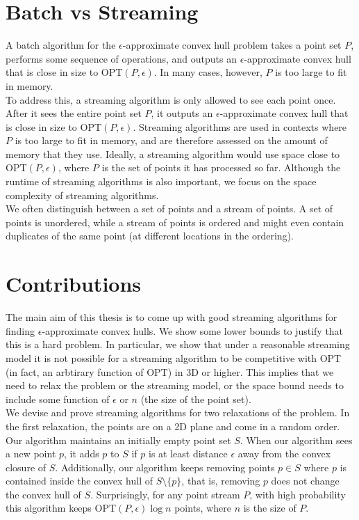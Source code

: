 \section{Batch vs Streaming}

A batch algorithm for the $\epsilon$-approximate convex hull problem takes a point set $P$, performs some sequence of operations, and outputs an $\epsilon$-approximate convex hull that is close in size to OPT$(P, \epsilon)$. In many cases, however, $P$ is too large to fit in memory.
\\

To address this, a streaming algorithm is only allowed to see each point once. After it sees the entire point set $P$, it outputs an $\epsilon$-approximate convex hull that is close in size to OPT$(P, \epsilon)$. Streaming algorithms are used in contexts where $P$ is too large to fit in memory, and are therefore assessed on the amount of memory that they use. Ideally, a streaming algorithm would use space close to OPT$(P, \epsilon)$, where $P$ is the set of points it has processed so far. Although the runtime of streaming algorithms is also important, we focus on the space complexity of streaming algorithms.
\\

We often distinguish between a set of points and a stream of points. A set of points is unordered, while a stream of points is ordered and might even contain duplicates of the same point (at different locations in the ordering).

\section{Contributions}
\label{sec:contributions}

The main aim of this thesis is to come up with good streaming algorithms for finding $\epsilon$-approximate convex hulls. We show some lower bounds to justify that this is a hard problem. In particular, we show that under a reasonable streaming model it is not possible for a streaming algorithm to be competitive with OPT (in fact, an arbtirary function of OPT) in 3D or higher. This implies that we need to relax the problem or the streaming model, or the space bound needs to include some function of $\epsilon$ or $n$ (the size of the point set).
\\

We devise and prove streaming algorithms for two relaxations of the problem. In the first relaxation, the points are on a 2D plane and come in a random order. Our algorithm maintains an initially empty point set $S$. When our algorithm sees a new point $p$, it adds $p$ to $S$ if $p$ is at least distance $\epsilon$ away from the convex closure of $S$. Additionally, our algorithm keeps removing points $p \in S$ where $p$ is contained inside the convex hull of $S \setminus \{ p \}$, that is, removing $p$ does not change the convex hull of $S$. Surprisingly, for any point stream $P$, with high probability this algorithm keeps OPT$(P, \epsilon) \log{n}$ points, where $n$ is the size of $P$.
\\


